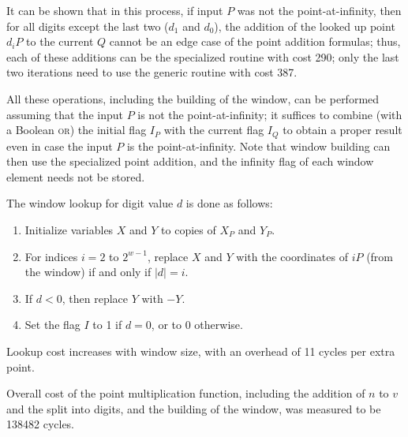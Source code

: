 \documentclass{llncs}
\begin{document}
It can be shown that in this process, if input $P$ was not the
point-at-infinity, then for all digits except the last two ($d_1$ and
$d_0$), the addition of the looked up point $d_i P$ to the current $Q$
cannot be an edge case of the point addition formulas; thus, each of
these additions can be the specialized routine with cost 290; only the
last two iterations need to use the generic routine with cost 387.

All these operations, including the building of the window, can be
performed assuming that the input $P$ is not the point-at-infinity; it
suffices to combine (with a Boolean \textsc{or}) the initial flag $I_P$
with the current flag $I_Q$ to obtain a proper result even in case the
input $P$ is the point-at-infinity. Note that window building can then
use the specialized point addition, and the infinity flag of each window
element needs not be stored.

The window lookup for digit value $d$ is done as follows:
\begin{enumerate}

    \item Initialize variables $X$ and $Y$ to copies of $X_P$ and $Y_P$.

    \item For indices $i = 2$ to $2^{w-1}$, replace $X$ and $Y$ with
    the coordinates of $iP$ (from the window) if and only if $|d| = i$.

    \item If $d < 0$, then replace $Y$ with $-Y$.

    \item Set the flag $I$ to 1 if $d = 0$, or to 0 otherwise.

\end{enumerate}
Lookup cost increases with window size, with an overhead of 11 cycles
per extra point.

Overall cost of the point multiplication function, including the
addition of $n$ to $v$ and the split into digits, and the building
of the window, was measured to be 138482 cycles.
\end{document}
